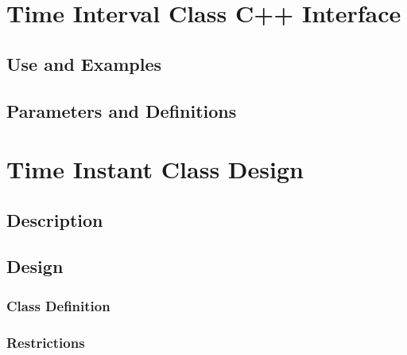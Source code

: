\documentclass[]{article}
\begin{document}


\section{Time Interval Class C++ Interface}

\subsection{Use and Examples}
%

\subsection{Parameters and Definitions}
%




\section{Time Instant Class Design}

\subsection{Description}


\subsection{Design}


\subsubsection{Class Definition}


\subsubsection{Restrictions}
%
\end{document}
